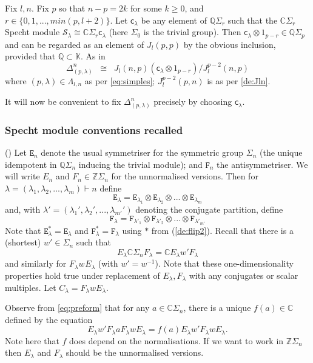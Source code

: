 \documentclass{article}
\newcommand{\ppm}[1]{\textcolor{red}{#1}}
\newcommand{\ppmm}[1]{#1}  %
\newcommand{\bajm}[1]{\textcolor{blue}{#1}}
\theoremstyle{definition}
\newcommand{\beq}{\begin{equation}}
\newcommand{\eq}{\end{equation}}
\newcommand{\mdef}{\refstepcounter{theorem}       \medskip \noindent ({\bf \thetheorem}) }
\newcommand{\Deltaa}{\Delta}   %
\newcommand{\Sym}{\Sigma}  %
\newcommand{\Q}{{\mathbb{Q}}}  %
\def\SS{\mathcal{S}} %
\def\l{\lambda}
\def\K{\mathbb{K}}
\def\C{\mathbb{C}}
\def\Z{\mathbb{Z}}
\numberwithin{equation}{subsection}
\begin{document}
\newcommand{\nE}{{\mathtt{E}}}  %
\newcommand{\nF}{{\mathtt{F}}}  %
\newcommand{\nC}{{\mathtt{C}}}  %
\newcommand{\cc}{{\mathsf{c}}}

Fix $l,n$. Fix $p$ so that $n-p=2k$ for some $k\geq 0$, and $r \in \{0, 1, ..., min(p,l+2)\}$. 
Let $\cc_\l$ be any element of $\Q\Sym_{r}$ such that the 
$\C\Sym_r$ Specht module $\SS_\l \cong \C\Sym_{r} \cc_\l$
(here $\Sym_0$ is the trivial group). 
Then $\cc_\l \otimes 1_{p-r} \in \Q\Sym_p$ and can be regarded as an element of $J_l(p,p)$ by the obvious inclusion, 
\ppmm{provided that $\Q\subset\K$}. 
%
%
As in \cite{KadarYu}  %
\[
\Deltaa^{n}_{(p,\lambda)} \;\; \cong  \;\; J_l(n,p) ( \cc_\l \otimes 1_{p-r}) / J_l^{p-2}(n,p)
\]
where $(p,\lambda) \in\Lambda_{l,n}$ as per \ref{eq:simples}; 
$J_l^{p-2}(p,n)$ is as per \ref{de:Jln}.

It will now be convenient to fix $ \Deltaa^{n}_{(p,\lambda)}$  precisely by choosing $\cc_\l$. 


\subsubsection{Specht module conventions recalled}


\mdef \label{pa:Specht}
Let $\nE_n$ denote the usual symmetriser for the symmetric group $\Sym_n$ (the unique idempotent in 
 $\Q\Sym_n$ inducing the trivial module); 
and $\nF_n$ the antisymmetriser. 
We will write $E_n$ and $F_n \in \Z\Sym_n$ for the unnormalised versions. 
Then for 
$\l = (\l_1 , \l_2, ..., \l_m) \vdash n$ define 
\[
\nE_\l = \nE_{\l_1} \otimes \nE_{\l_2} \otimes ... \otimes \nE_{\l_m}
\]
and, with 
$\l' = (\l_1' , \l_2' , ...,\l_{m'}')$ denoting the conjugate partition, define 
\[
\nF_\l = \nF_{\l'_1} \otimes \nF_{\l'_2} \otimes ... \otimes \nF_{\l'_{m'}}
\]
Note that $\nE_\l^* = \nE_\l$ and $\nF_\l^* = \nF_\l$ using $*$ from (\ref{de:flip2}). 
Recall that there is a (shortest) $w' \in \Sym_n$ such that 
\beq  \label{eq:preform}  
E_\l \C \Sym_n  F_\l = \C E_\l w' F_\l
\eq 
and similarly for $F_\l w^{} E_\l$ (with $w' = w^{-1}$). 
Note that these one-dimensionality properties hold true under replacement of $E_\l , F_\l$ with any conjugates 
or scalar multiples. 
Let $C_\l =  F_\l w E_\l $. 

Observe from \eqref{eq:preform} that for any $a \in \C \Sym_n$, there is a unique $f(a) \in \C$ defined by the equation
\[E_\l w' F_\l a F_\l w E_\l = f(a) E_\l w' F_\l w E_\l.\]
Note here that $f$ does depend on the normalisations. %
If we want to work in $\Z\Sym_n$ then $E_\l$ and $F_\l$ should be the unnormalised versions. 
\end{document}
